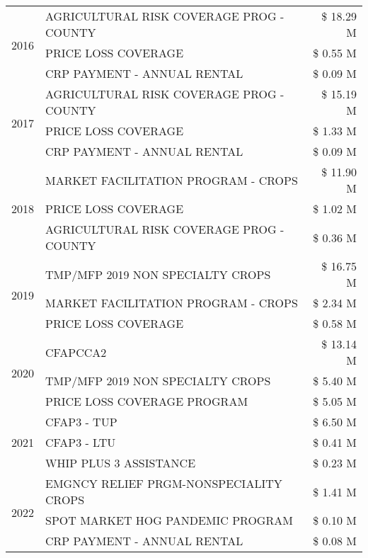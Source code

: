 \begin{tabular}{llr}
\cline{1-3}
\multirow[t]{3}{*}{2016} & AGRICULTURAL RISK COVERAGE PROG - COUNTY & \$ 18.29 M \\
 & PRICE LOSS COVERAGE & \$ 0.55 M \\
 & CRP PAYMENT - ANNUAL RENTAL & \$ 0.09 M \\
\cline{1-3}
\multirow[t]{3}{*}{2017} & AGRICULTURAL RISK COVERAGE PROG - COUNTY & \$ 15.19 M \\
 & PRICE LOSS COVERAGE & \$ 1.33 M \\
 & CRP PAYMENT - ANNUAL RENTAL & \$ 0.09 M \\
\cline{1-3}
\multirow[t]{3}{*}{2018} & MARKET FACILITATION PROGRAM - CROPS & \$ 11.90 M \\
 & PRICE LOSS COVERAGE & \$ 1.02 M \\
 & AGRICULTURAL RISK COVERAGE PROG - COUNTY & \$ 0.36 M \\
\cline{1-3}
\multirow[t]{3}{*}{2019} & TMP/MFP 2019 NON SPECIALTY CROPS & \$ 16.75 M \\
 & MARKET FACILITATION PROGRAM - CROPS & \$ 2.34 M \\
 & PRICE LOSS COVERAGE & \$ 0.58 M \\
\cline{1-3}
\multirow[t]{3}{*}{2020} & CFAPCCA2 & \$ 13.14 M \\
 & TMP/MFP 2019 NON SPECIALTY CROPS & \$ 5.40 M \\
 & PRICE LOSS COVERAGE PROGRAM & \$ 5.05 M \\
\cline{1-3}
\multirow[t]{3}{*}{2021} & CFAP3 - TUP & \$ 6.50 M \\
 & CFAP3 - LTU & \$ 0.41 M \\
 & WHIP PLUS 3 ASSISTANCE & \$ 0.23 M \\
\cline{1-3}
\multirow[t]{3}{*}{2022} & EMGNCY RELIEF PRGM-NONSPECIALITY CROPS & \$ 1.41 M \\
 & SPOT MARKET HOG PANDEMIC PROGRAM & \$ 0.10 M \\
 & CRP PAYMENT - ANNUAL RENTAL & \$ 0.08 M \\
\cline{1-3}
\bottomrule
\end{tabular}
